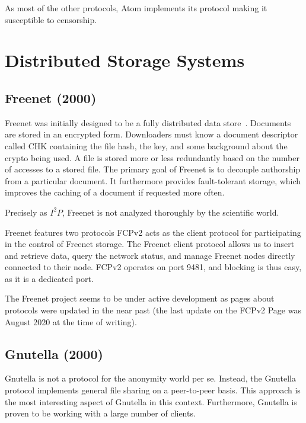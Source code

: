 As most of the other protocols, Atom implements its protocol making it susceptible to censorship.


\section{Distributed Storage Systems}

\subsection{Freenet (2000)}
Freenet was initially designed to be a fully distributed data store~\cite{freenet}. Documents are stored in an encrypted form. Downloaders must know a document descriptor called CHK containing the file hash, the key, and some background about the crypto being used. A file is stored more or less redundantly based on the number of accesses to a stored file. The primary goal of Freenet is to decouple authorship from a particular document. It furthermore provides fault-tolerant storage, which improves the caching of a document if requested more often.

Precisely as $I^2P$, Freenet is not analyzed thoroughly by the scientific world. 

Freenet features two protocols FCPv2 acts as the client protocol for participating in the control of Freenet storage. The Freenet client protocol allows us to insert and retrieve data, query the network status, and manage Freenet nodes directly connected to their node. FCPv2 operates on port 9481, and blocking is thus easy, as it is a dedicated port. 

The Freenet project seems to be under active development as pages about protocols were updated in the near past (the last update on the FCPv2 Page was August  2020 at the time of writing).

\subsection{Gnutella (2000)}
Gnutella is not a protocol for the anonymity world per se. Instead, the Gnutella protocol implements general file sharing on a peer-to-peer basis. This approach is the most interesting aspect of Gnutella in this context. Furthermore, Gnutella is proven to be working with a large number of clients.

